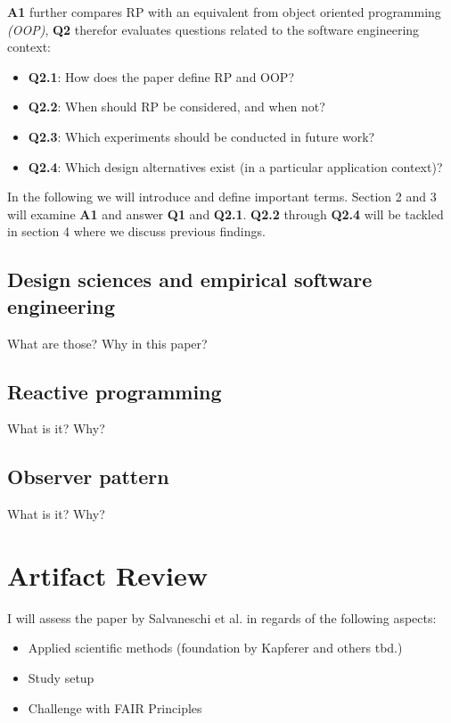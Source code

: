 \documentclass[11pt,a4paper,twocolumn]{article}
\begin{document}
	\textbf{A1} further compares RP with an equivalent from object oriented programming \emph{(OOP)}, \textbf{Q2} therefor evaluates questions related to the software engineering context:

	\begin{itemize}
		\item \textbf{Q2.1}: How does the paper define RP and OOP?
		\item \textbf{Q2.2}: When should RP be considered, and when not?
		\item \textbf{Q2.3}: Which experiments should be conducted in future work?
		\item \textbf{Q2.4}: Which design alternatives exist (in a particular application context)?
	\end{itemize}

	In the following we will introduce and define important terms. Section 2 and 3 will examine \textbf{A1} and answer \textbf{Q1} and \textbf{Q2.1}. \textbf{Q2.2} through \textbf{Q2.4} will be tackled in section 4 where we discuss previous findings.

	\subsection{Design sciences and empirical software engineering}
	What are those? Why in this paper?

	\subsection{Reactive programming}
	What is it? Why?

	\subsection{Observer pattern}
	What is it? Why?

	\section{Artifact Review}
	I will assess the paper by Salvaneschi et al. \cite{7827078} in regards of the following aspects:
	\begin{itemize}
		\item Applied scientific methods (foundation by Kapferer \cite{kapferer:2019:empirical} and others tbd.)
		\item Study setup
		\item Challenge with FAIR Principles \cite{2019arXiv190805986H} \cite{wilkinson:2016}
	\end{itemize}
\end{document}
